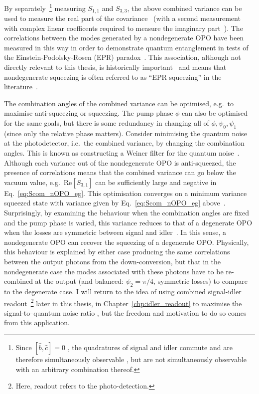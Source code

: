 By separately~\footnote{Since $[\hat b, \hat c]=0$ , the quadratures of signal and idler commute and are therefore simultaneously observable , but are not simultaneously observable with an arbitrary combination thereof.} measuring $S_{1,1}$ and $S_{3,3}$, the above combined variance can be used to measure the real part of the covariance~\cite{} (with a second measurement with complex linear coefficents required to measure the imaginary part~\cite{}). The correlations between the modes generated by a nondegenerate OPO have been measured in this way in order to demonstrate quantum entanglement in tests of the Einstein-Podolsky-Rosen (EPR) paradox~\cite{Reid1985,Schori2001,EPR19..}. This association, although not directly relevant to this thesis, is historically important~\cite{} and means that nondegenerate squeezing is often referred to as ``EPR squeezing'' in the literature~\cite{}. %

The combination angles of the combined variance can be optimised, e.g.\ to maximise anti-squeezing or squeezing. The pump phase $\phi$ can also be optimised for the same goals, but there is some redundancy in changing all of $\phi, \psi_0, \psi_1$ (since only the relative phase matters). Consider minimising the quantum noise at the photodetector, i.e.\ the combined variance, by changing the combination angles. This is known as constructing a Weiner filter for the quantum noise~\cite{}. Although each variance out of the nondegenerate OPO is anti-squeezed, the presence of correlations means that the combined variance can go below the vacuum value, e.g.\ $\text{Re}[S_{3,1}]$ can be sufficiently large and negative in Eq.~\ref{eq:Scom_nOPO_eg}. This optimisation  converges on a minimum variance squeezed state with variance given by Eq.~\ref{eq:Scom_nOPO_eg} above~\cite{}. Surprisingly, by examining the behaviour when the combination angles are fixed and the pump phase is varied, this variance reduces to that of a degenerate OPO when the losses are symmetric between signal and idler~\cite{}. In this sense, a nondegenerate OPO can recover the squeezing of a degenerate OPO. Physically, this behaviour is explained by either case producing the same correlations between the output photons from the down-conversion, but that in the nondegenerate case the modes associated with these photons have to be re-combined at the output (and balanced: $\psi_2=\pi/4$, symmetric losses) to compare to the degenerate case. 
I will return to the idea of using combined signal-idler readout~\footnote{Here, readout refers to the photo-detection.} later in this thesis, in Chapter~\ref{chp:idler_readout} to maximise the signal-to--quantum noise ratio , but the freedom and motivation to do so comes  from this application.



